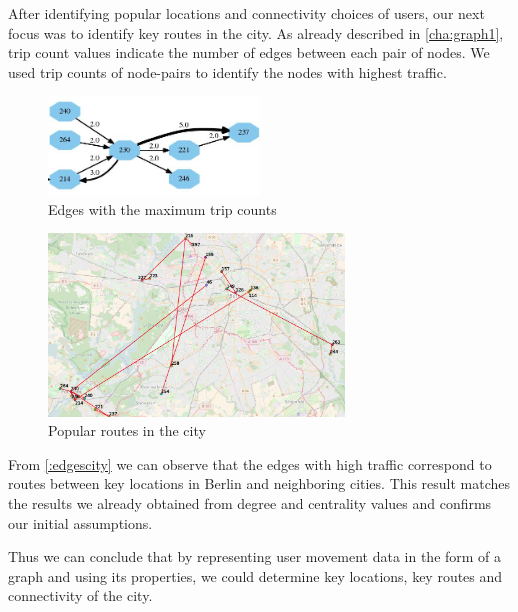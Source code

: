 After identifying popular locations and connectivity choices of users, our next focus was to identify key routes in the city. As already described in \autoref{cha:graph1}, trip count values indicate the number of edges between each pair of nodes. We used trip counts of node-pairs to identify the nodes with highest traffic.
\begin{figure}[!ht]
	\centering
	\includegraphics[width=0.5\textwidth]{images/max_tripcount.png}
	\caption{Edges with the maximum trip counts}
	\label{:tripcount}
\end{figure}  
\begin{figure}[!ht]
	\centering
	\includegraphics[width=0.7\textwidth]{images/edges_city.png}
	\caption{Popular routes in the city}
	\label{:edgescity}
\end{figure} 
\FloatBarrier

From \autoref{:edgescity} we can observe that the edges with high traffic correspond to routes between key locations in Berlin and neighboring cities. This result matches the results we already obtained from degree and centrality values and confirms our initial assumptions.

Thus we can conclude that by representing user movement data in the form of a graph and using its properties, we could determine key locations, key routes and connectivity of the city. 
  